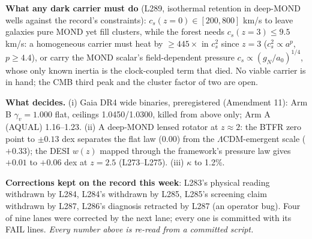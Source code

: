 \documentclass[10pt]{article}
\begin{document}
\textbf{What any dark carrier must do} (L289, isothermal retention in deep-MOND wells against the record's constraints): $c_s(z{=}0)\in[200,800]$ km/s to leave galaxies pure MOND yet fill clusters, while the forest needs $c_s(z{=}3)\le9.5$ km/s: a homogeneous carrier must heat by $\ge445\times$ in $c_s^2$ since $z=3$ ($c_s^2\propto a^{p}$, $p\ge4.4$), or carry the MOND scalar's field-dependent pressure $c_s\propto(g_N/a_0)^{1/4}$, whose only known inertia is the clock-coupled term that died. No viable carrier is in hand; the CMB third peak and the cluster factor of two are open.

\textbf{What decides.} (i) Gaia DR4 wide binaries, preregistered (Amendment 11): Arm B $\gamma_v=1.000$ flat, ceilings 1.0450/1.0300, killed from above only; Arm A (AQUAL) 1.16--1.23. (ii) A deep-MOND lensed rotator at $z\approx2$: the BTFR zero point to $\pm0.13$ dex separates the flat law (0.00) from the $\Lambda$CDM-emergent scale ($+0.33$); the DESI $w(z)$ mapped through the framework's pressure law gives $+0.01$ to $+0.06$ dex at $z=2.5$ (L273--L275). (iii) $\kappa$ to 1.2\%.

\textbf{Corrections kept on the record this week}: L283's physical reading withdrawn by L284, L284's withdrawn by L285, L285's screening claim withdrawn by L287, L286's diagnosis retracted by L287 (an operator bug). Four of nine lanes were corrected by the next lane; every one is committed with its FAIL lines. \emph{Every number above is re-read from a committed script.}
\end{document}

